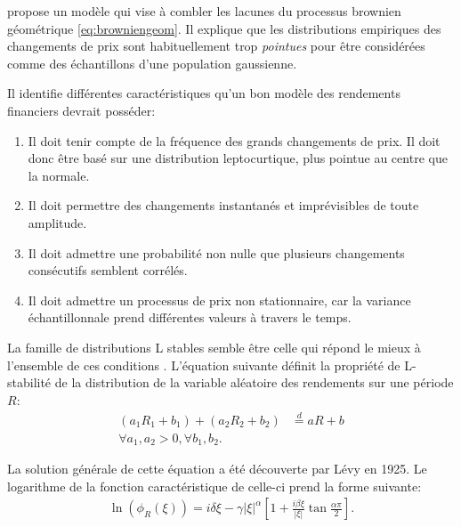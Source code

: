 \cite{mandelbrot1963variation} propose un modèle qui vise à combler
les lacunes du processus brownien géométrique
\eqref{eq:browniengeom}. Il explique que les distributions empiriques
des changements de prix sont habituellement trop \emph{pointues} pour
être considérées comme des échantillons d'une population gaussienne.

Il identifie différentes caractéristiques qu'un bon modèle des
rendements financiers devrait posséder:

\begin{enumerate}
  \label{enum:mandelbrot}
\item Il doit tenir compte de la fréquence des grands changements de
  prix. Il doit donc être basé sur une distribution leptocurtique,
  plus pointue au centre que la normale.
\item Il doit permettre des changements instantanés et imprévisibles
  de toute amplitude.
\item Il doit admettre une probabilité non nulle que plusieurs
  changements consécutifs semblent corrélés.
\item Il doit admettre un processus de prix non stationnaire, car la
  variance échantillonnale prend différentes valeurs à travers le
  temps.
\end{enumerate}

La famille de distributions L stables semble être celle qui répond le
mieux à l'ensemble de ces conditions \citep{walterlevy}. L'équation
suivante définit la propriété de L-stabilité de la distribution de la
variable aléatoire des rendements sur une période $R$:
\begin{align}
  (a_1 R_1 + b_1) + (a_2 R_2 + b_2) &\stackrel{d}{=} aR + b \\
  \forall a_1,a_2 > 0, \forall b_1, b_2.
\end{align}

La solution générale de cette équation a été découverte par Lévy en
1925. Le logarithme de la fonction caractéristique de celle-ci prend
la forme suivante:
\begin{align}
  \ln{(\phi_{R}(\xi))} = i\delta \xi - \gamma |\xi|^{\alpha}
  \left[1+\frac{i\beta \xi}{|\xi|} \tan{\frac{\alpha\pi}{2}} \right].
\end{align}

